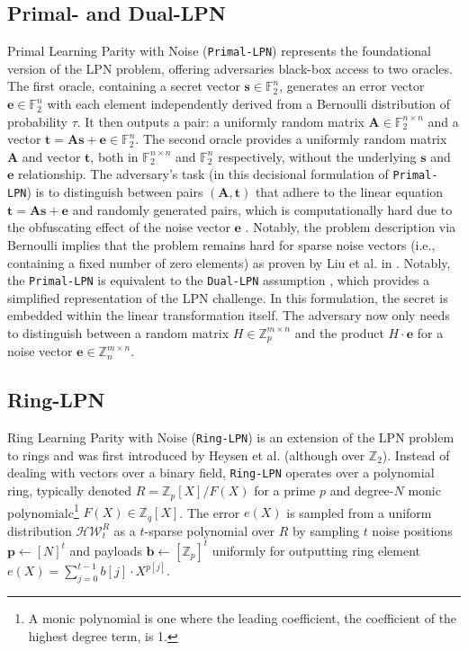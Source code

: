 \subsection{Primal- and Dual-LPN}
Primal Learning Parity with Noise (\texttt{Primal-LPN}) represents the foundational version of the LPN problem, offering adversaries black-box access to two oracles. The first oracle, containing a secret vector \( \mathbf{s} \in \mathbb{F}_2^{n} \), generates an error vector \( \mathbf{e} \in \mathbb{F}_2^{n} \) with each element independently derived from a Bernoulli distribution of probability \( \tau \). It then outputs a pair: a uniformly random matrix \( \mathbf{A} \in \mathbb{F}_2^{n\times n} \) and a vector \( \mathbf{t} = \mathbf{A}\mathbf{s} + \mathbf{e} \in \mathbb{F}_2^{n} \). The second oracle provides a uniformly random matrix \( \mathbf{A} \) and vector \( \mathbf{t} \), both in \( \mathbb{F}_2^{n\times n} \) and \( \mathbb{F}_2^{n} \) respectively, without the underlying \( \mathbf{s} \) and \( \mathbf{e} \) relationship. The adversary's task (in this decisional formulation of \texttt{Primal-LPN}) is to distinguish between pairs \((\mathbf{A}, \mathbf{t})\) that adhere to the linear equation \(\mathbf{t} = \mathbf{A}\mathbf{s} + \mathbf{e}\) and randomly generated pairs, which is computationally hard due to the obfuscating effect of the noise vector \( \mathbf{e} \) \cite{zhao2018hardness}. Notably, the problem description via Bernoulli implies that the problem remains hard for sparse noise vectors (i.e., containing a fixed number of zero elements) as proven by Liu et al. in \cite{liu2017hardness}. Notably, the \texttt{Primal-LPN} is equivalent to the \texttt{Dual-LPN} assumption \cite{couteau2021silver}, which provides a simplified representation of the LPN challenge. In this formulation, the secret is embedded within the linear transformation itself. The adversary now only needs to distinguish between a random matrix $H \in \mathbb{Z}_p^{m \times n}$ and the product $H \cdot \mathbf{e}$ for a noise vector $\mathbf{e}\in \mathbb{Z}_n^{m \times n}$.

\subsection{Ring-LPN}
\label{prelim:ring_lpn}
Ring Learning Parity with Noise (\texttt{Ring-LPN}) is an extension of the LPN problem to rings and was first introduced by Heysen et al. (although over $\mathbb{Z}_2$). Instead of dealing with vectors over a binary field, \texttt{Ring-LPN} operates over a polynomial ring, typically denoted $ R =\mathbb{Z}_p[X]/F(X)$ for a prime $p$ and degree-$N$ monic polynomialc\footnote{A monic polynomial is one where the leading coefficient, the coefficient of the highest degree term, is 1.} $F(X)\in \mathbb{Z}_q[X] $. The error $e(X)$ is sampled from a uniform distribution $\mathcal{H W}_{t}^{R}$ as a $t$-sparse polynomial over $R$ by sampling $t$ noise positions $\mathbf{p} \leftarrow [N]^t$ and payloads $\mathbf{b} \leftarrow [\mathbb{Z}_p]^t$ uniformly for outputting ring element $e(X) = \sum_{j=0}^{t-1} b[j] \cdot X^{p[j]}$. 


